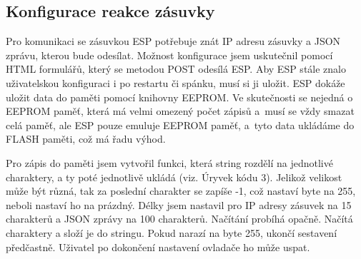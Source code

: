 \documentclass[a4paper, 12pt]{report}
\begin{document}
    \subsection{Konfigurace reakce zásuvky}
    Pro komunikaci se zásuvkou ESP potřebuje znát IP adresu zásuvky a JSON zprávu, kterou bude odesílat. Možnost konfigurace jsem uskutečnil pomocí HTML formulářů, který se metodou POST odesílá ESP. Aby ESP stále znalo uživatelskou konfiguraci i po restartu či spánku, musí si ji uložit.
    ESP dokáže uložit data do paměti pomocí knihovny EEPROM. Ve skutečnosti se nejedná o EEPROM paměť, která má velmi omezený počet zápisů a~musí se vždy smazat celá paměť, ale ESP pouze emuluje EEPROM paměť, a~tyto data ukládáme do FLASH paměti, což má řadu výhod.\par
    Pro zápis do paměti jsem vytvořil funkci, která string rozdělí na jednotlivé charaktery, a ty poté jednotlivě ukládá (viz. Úryvek kódu 3).
    Jelikož velikost může být různá, tak za poslední charakter se zapíše -1, což nastaví byte na 255, neboli nastaví ho na prázdný.
    Délky jsem nastavil pro IP adresy zásuvek na 15 charakterů a JSON zprávy na 100 charakterů.
    Načítání probíhá opačně.
    Načítá charaktery a složí je do stringu.
    Pokud narazí na byte 255, ukončí sestavení předčastně.
    Uživatel po dokončení nastavení ovladače ho může uspat.
%
\end{document}
